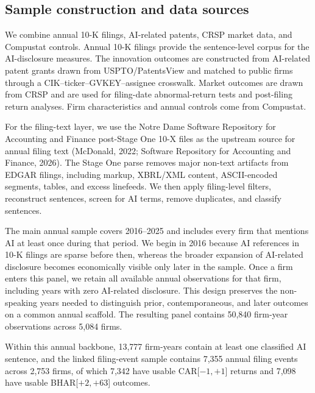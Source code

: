 \subsection{Sample construction and data sources}

We combine annual 10-K filings, AI-related patents, CRSP market data, and Compustat controls. Annual 10-K filings provide the sentence-level corpus for the AI-disclosure measures. The innovation outcomes are constructed from AI-related patent grants drawn from USPTO/PatentsView and matched to public firms through a CIK--ticker--GVKEY--assignee crosswalk. Market outcomes are drawn from CRSP and are used for filing-date abnormal-return tests and post-filing return analyses. Firm characteristics and annual controls come from Compustat.

For the filing-text layer, we use the Notre Dame Software Repository for Accounting and Finance post-Stage One 10-X files as the upstream source for annual filing text (McDonald, 2022; Software Repository for Accounting and Finance, 2026). The Stage One parse removes major non-text artifacts from EDGAR filings, including markup, XBRL/XML content, ASCII-encoded segments, tables, and excess linefeeds. We then apply filing-level filters, reconstruct sentences, screen for AI terms, remove duplicates, and classify sentences.

The main annual sample covers 2016--2025 and includes every firm that mentions AI at least once during that period. We begin in 2016 because AI references in 10-K filings are sparse before then, whereas the broader expansion of AI-related disclosure becomes economically visible only later in the sample. Once a firm enters this panel, we retain all available annual observations for that firm, including years with zero AI-related disclosure. This design preserves the non-speaking years needed to distinguish prior, contemporaneous, and later outcomes on a common annual scaffold. The resulting panel contains 50,840 firm-year observations across 5,084 firms.

Within this annual backbone, 13,777 firm-years contain at least one classified AI sentence, and the linked filing-event sample contains 7,355 annual filing events across 2,753 firms, of which 7,342 have usable CAR[$-1,+1$] returns and 7,098 have usable BHAR[$+2,+63$] outcomes.

